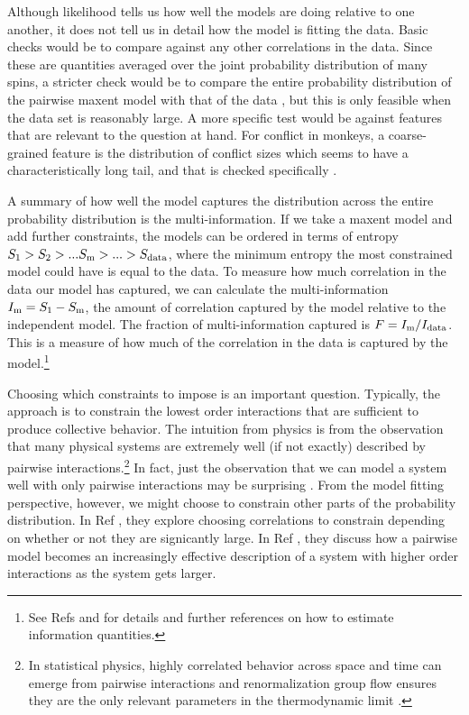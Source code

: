 \documentclass[aps,prl,twocolumn,nofootinbib]{revtex4-1}
\begin{document}
Although likelihood tells us how well the models are doing relative to one another, it does not tell us in detail how the model is fitting the data.
Basic checks would be to compare against any other correlations in the data.
Since these are quantities averaged over the joint probability distribution of many spins, a stricter check would be to compare the entire probability distribution of the pairwise maxent model with that of the data \cite{Lee:2015ev}, but this is only feasible when the data set is reasonably large. 
A more specific test would be against features that are relevant to the question at hand. For conflict in monkeys, a coarse-grained feature is the distribution of conflict sizes which seems to have a characteristically long tail, and that is checked specifically \cite{Daniels:1cq}. 

A summary of how well the model captures the distribution across the entire probability distribution is the multi-information. If we take a maxent model and add further constraints, the models can be ordered in terms of entropy $S_{\rm 1}>S_{2}>...S_{\rm m}>...>S_{\rm data}$, where the minimum entropy the most constrained model could have is equal to the data. To measure how much correlation in the data our model has captured, we can calculate the multi-information $I_{\rm m} = S_{\rm 1}-S_{\rm m}$, the amount of correlation captured by the model relative to the independent model. The fraction of multi-information captured is $F=I_{\rm m}/I_{\rm data}$. This is a measure of how much of the correlation in the data is captured by the model.\footnote{See Refs \cite{Bialek:2012ueb} and \cite{Lee:2015ev} for details and further references on how to estimate information quantities.}

Choosing which constraints to impose is an important question. Typically, the approach is to constrain the lowest order interactions that are sufficient to produce collective behavior. The intuition from physics is from the observation that many physical systems are extremely well (if not exactly) described by pairwise interactions.\footnote{In statistical physics, highly correlated behavior across space and time can emerge from pairwise interactions and renormalization group flow ensures they are the only relevant parameters in the thermodynamic limit \cite{}.} In fact, just the observation that we can model a system well with only pairwise interactions may be surprising \cite{Ranganathan:2007wz}. From the model fitting perspective, however, we might choose to constrain other parts of the probability distribution. In Ref \cite{Ganmor:2011ct}, they explore choosing correlations to constrain depending on whether or not they are signicantly large. In Ref \cite{Nemenman:2016kl}, they discuss how a pairwise model becomes an increasingly effective description of a system with higher order interactions as the system gets larger.
\end{document}
